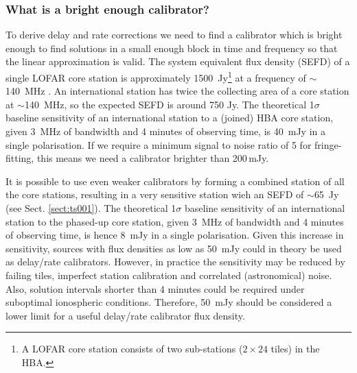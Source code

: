 \documentclass[graybox]{svmult}
\begin{document}
\subsubsection{What is a bright enough calibrator?}
\label{sect:brightcal}
To derive delay and rate corrections we need to find a calibrator which is
bright enough to find solutions in a small enough block in time and frequency
so that the linear approximation is valid. 
The system equivalent flux density (SEFD) of a single LOFAR core station is
approximately 1500~Jy\footnote{A LOFAR core station consists of two
sub-stations ($2\times24$ tiles) in the HBA.} at a frequency of $\sim$140~MHz
\citep{vanhaarlem13}.  An international station has twice the collecting area
of a core station at $\sim$140~MHz, so the expected SEFD is around 750 Jy.  
The theoretical 1$\sigma$ baseline sensitivity of an international
station to a (joined) HBA core station, given 3~MHz of bandwidth and 4 minutes
of observing time, is 40~mJy in a single polarisation.  
If we require a minimum signal to noise ratio of 5 for fringe-fitting,
this means we need a calibrator brighter than 200\,mJy.

It is possible to use even weaker calibrators by forming a combined station of
all the core stations, resulting in a very sensitive station wieh an SEFD of
$\sim$65~Jy (see Sect. \ref{sect:ts001}).  The theoretical 1$\sigma$ baseline
sensitivity of an international station to the phased-up core station, given
3~MHz of bandwidth and 4 minutes of observing time, is hence 8~mJy in a single
polarisation.  Given this increase in sensitivity, sources with flux densities
as low as 50~mJy could in theory be used as delay/rate calibrators. However, in
practice the sensitivity may be reduced by failing tiles, imperfect station
calibration and correlated (astronomical) noise.  Also, solution intervals
shorter than 4 minutes could be required under suboptimal ionospheric
conditions.  Therefore, 50~mJy should be considered a lower limit for a useful
delay/rate calibrator flux density. 
\end{document}

